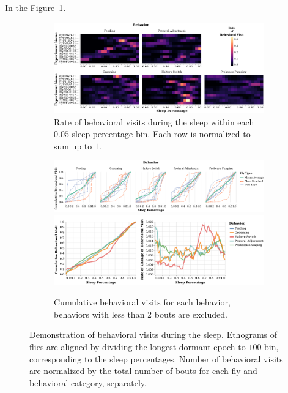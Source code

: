 In the Figure~\ref{figure:temporal-organization-behavior}.

\begin{figure}[htb!]
	\centering
	\begin{subfigure}[b]{0.975\linewidth}
		\centering\includegraphics[width=\linewidth]{figures/Heatmap_BehavioralUsage-Ann.pdf}
		\caption{Rate of behavioral visits during the sleep within each $0.05$ sleep percentage bin. Each row is normalized to sum up to $1$.}
	\end{subfigure}%

	\centering
	\begin{subfigure}[b]{0.975\linewidth}
		\centering\includegraphics[width=\linewidth]{figures/CumulativeLine_BehavioralUsage-Ann.pdf}
		\centering\includegraphics[width=\linewidth]{figures/MeanCumRofC_BehavioralUsage-Ann.pdf}
		\caption{Cumulative behavioral visits for each behavior, behaviors with less than 2 bouts are excluded.}
	\end{subfigure}%

	\caption[Demonstration of behavioral visits during the sleep.]{Demonstration of behavioral visits during the sleep.
		Ethograms of flies are aligned by dividing the longest dormant epoch to $100$ bin, corresponding to the sleep percentages.
		Number of behavioral visits are normalized by the total number of bouts for each fly and behavioral category, separately. \label{figure:temporal-organization-behavior}}

\end{figure}
